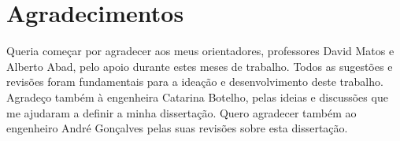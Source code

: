 \newpage


\chapter*{Agradecimentos}
\thispagestyle{empty}

Queria começar por agradecer aos meus orientadores, professores David Matos e Alberto Abad, pelo apoio durante estes meses de trabalho. Todos as sugestões e revisões foram fundamentais para a ideação e desenvolvimento deste trabalho. Agradeço também à engenheira Catarina Botelho, pelas ideias e discussões que me ajudaram a definir a minha dissertação. Quero agradecer também ao engenheiro André Gonçalves pelas suas revisões sobre esta dissertação.

